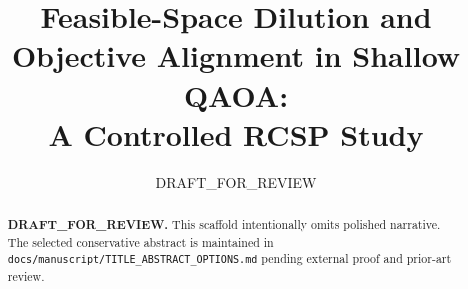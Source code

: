 \documentclass[11pt]{article}
\title{Feasible-Space Dilution and Objective Alignment in Shallow QAOA:\\A Controlled RCSP Study}
\author{DRAFT\_FOR\_REVIEW}
\date{}
\begin{document}
\maketitle

\begin{abstract}
\textbf{DRAFT\_FOR\_REVIEW.} This scaffold intentionally omits polished
narrative. The selected conservative abstract is maintained in
\texttt{docs/manuscript/TITLE\_ABSTRACT\_OPTIONS.md} pending external proof and
prior-art review.
\end{abstract}















\appendix







\end{document}
